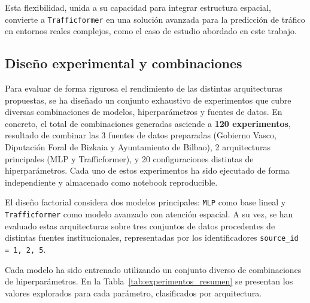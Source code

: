 Esta flexibilidad, unida a su capacidad para integrar estructura espacial, convierte a \texttt{Trafficformer} en una solución avanzada para la predicción de tráfico en entornos reales complejos, como el caso de estudio abordado en este trabajo.

\subsection{Diseño experimental y combinaciones}
\label{sec:diseño_exp_combinaciones}

Para evaluar de forma rigurosa el rendimiento de las distintas arquitecturas propuestas, se ha diseñado un conjunto exhaustivo de experimentos que cubre diversas combinaciones de modelos, hiperparámetros y fuentes de datos. En concreto, el total de combinaciones generadas asciende a \textbf{120 experimentos}, resultado de combinar las 3 fuentes de datos preparadas (Gobierno Vasco, Diputación Foral de Bizkaia y Ayuntamiento de Bilbao), 2 arquitecturas principales (MLP y Trafficformer), y 20 configuraciones distintas de hiperparámetros. Cada uno de estos experimentos ha sido ejecutado de forma independiente y almacenado como notebook reproducible.

El diseño factorial considera dos modelos principales: \texttt{MLP} como base lineal y \texttt{Trafficformer} como modelo avanzado con atención espacial. A su vez, se han evaluado estas arquitecturas sobre tres conjuntos de datos procedentes de distintas fuentes institucionales, representadas por los identificadores \texttt{source\_id = 1, 2, 5}.

Cada modelo ha sido entrenado utilizando un conjunto diverso de combinaciones de hiperparámetros. En la Tabla~\ref{tab:experimentos_resumen} se presentan los valores explorados para cada parámetro, clasificados por arquitectura.

